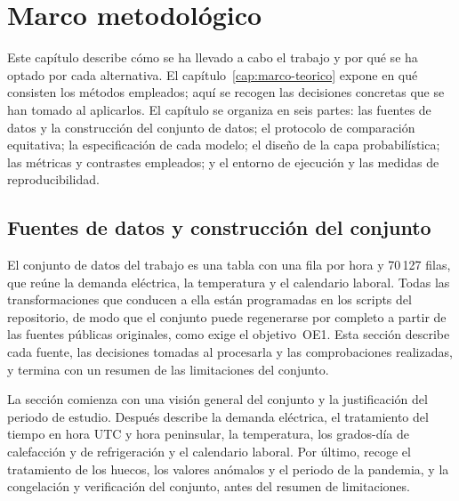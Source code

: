 
\chapter{Marco metodológico}\label{cap:metodologia}

Este capítulo describe cómo se ha llevado a cabo el trabajo y por qué se ha
optado por cada alternativa. El capítulo~\ref{cap:marco-teorico} expone en
qué consisten los métodos empleados; aquí se recogen las decisiones concretas
que se han tomado al aplicarlos. El capítulo se organiza en seis partes: las
fuentes de datos y la construcción del conjunto de datos; el protocolo de
comparación equitativa; la especificación de cada modelo; el diseño de la
capa probabilística; las métricas y contrastes empleados; y el entorno de
ejecución y las medidas de reproducibilidad.

\section{Fuentes de datos y construcción del conjunto}\label{sec:datos}

El conjunto de datos del trabajo es una tabla con una fila por hora y
70\,127 filas, que reúne la demanda eléctrica, la temperatura y el calendario
laboral. Todas las transformaciones que conducen a ella están programadas en
los scripts del repositorio, de modo que el conjunto puede regenerarse por
completo a partir de las fuentes públicas originales, como exige el
objetivo~OE1. Esta sección describe cada fuente, las decisiones tomadas al
procesarla y las comprobaciones realizadas, y termina con un resumen de las
limitaciones del conjunto.

La sección comienza con una visión general del conjunto y la justificación del
periodo de estudio. Después describe la demanda eléctrica, el tratamiento del
tiempo en hora UTC y hora peninsular, la temperatura, los grados-día de
calefacción y de refrigeración y el calendario laboral. Por último, recoge el
tratamiento de los huecos, los valores anómalos y el periodo de la pandemia, y
la congelación y verificación del conjunto, antes del resumen de limitaciones.

